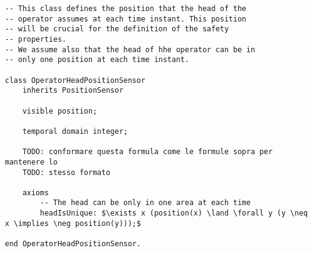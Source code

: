 \begin{lstlisting}[fontadjust, mathescape, frame=single] 
-- This class defines the position that the head of the
-- operator assumes at each time instant. This position
-- will be crucial for the definition of the safety 
-- properties. 
-- We assume also that the head of hhe operator can be in
-- only one position at each time instant.

class OperatorHeadPositionSensor
    inherits PositionSensor
    
    visible position;

    temporal domain integer;

    TODO: conformare questa formula come le formule sopra per mantenere lo 
    TODO: stesso formato

    axioms
        -- The head can be only in one area at each time
        headIsUnique: $\exists x (position(x) \land \forall y (y \neq x \implies \neg position(y)));$

end OperatorHeadPositionSensor.
\end{lstlisting}